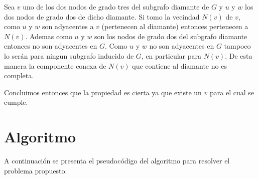\documentclass[a4paper,11pt] {article}
\begin{document}
\begin{itemize}
Sea $v$ uno de los dos nodos de grado tres del subgrafo diamante de $G$ y $u$ y $w$ los dos nodos de grado dos de dicho diamante. Si tomo la vecindad $N(v)$ de $v$, como $u$ y $w$ son adyacentes a $v$ (pertenecen al diamante) entonces pertenecen a $N(v)$. Ademas como $u$ y $w$ son los nodos de grado dos del subgrafo diamante entonces no son adyacentes en $G$. Como $u$ y $w$ no son adyacentes en $G$ tampoco lo ser\'an para ningun subgrafo inducido de $G$, en particular para $N(v)$. De esta manera la componente conexa de $N(v)$ que contiene al diamante no es completa.

Concluimos entonces que la propiedad es cierta ya que existe un $v$ para el cual se cumple.

\end{itemize}

\section*{Algoritmo}

A continuaci\'on se presenta el pseudoc\'odigo del algoritmo para resolver el problema propuesto.
\end{document}
